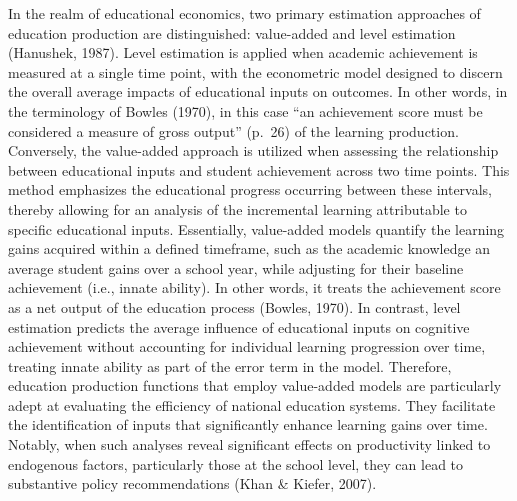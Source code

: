 \documentclass[
]{article}
\begin{document}
In the realm of educational economics, two primary estimation approaches
of education production are distinguished: value-added and level
estimation (Hanushek, 1987). Level estimation is applied when academic
achievement is measured at a single time point, with the econometric
model designed to discern the overall average impacts of educational
inputs on outcomes. In other words, in the terminology of Bowles (1970),
in this case ``an achievement score must be considered a measure of
gross output'' (p.~26) of the learning production. Conversely, the
value-added approach is utilized when assessing the relationship between
educational inputs and student achievement across two time points. This
method emphasizes the educational progress occurring between these
intervals, thereby allowing for an analysis of the incremental learning
attributable to specific educational inputs. Essentially, value-added
models quantify the learning gains acquired within a defined timeframe,
such as the academic knowledge an average student gains over a school
year, while adjusting for their baseline achievement (i.e., innate
ability). In other words, it treats the achievement score as a net
output of the education process (Bowles, 1970). In contrast, level
estimation predicts the average influence of educational inputs on
cognitive achievement without accounting for individual learning
progression over time, treating innate ability as part of the error term
in the model. Therefore, education production functions that employ
value-added models are particularly adept at evaluating the efficiency
of national education systems. They facilitate the identification of
inputs that significantly enhance learning gains over time. Notably,
when such analyses reveal significant effects on productivity linked to
endogenous factors, particularly those at the school level, they can
lead to substantive policy recommendations (Khan \& Kiefer, 2007).
\end{document}

